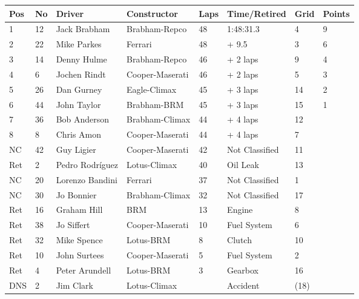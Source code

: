 \documentclass{article}
\begin{document}
\begin{tabular}{llllllll}
\toprule
Pos & No & Driver & Constructor & Laps & Time/Retired & Grid & Points \\
\midrule
1 & 12 & Jack Brabham & Brabham-Repco & 48 & 1:48:31.3 & 4 & 9 \\
2 & 22 & Mike Parkes & Ferrari & 48 & + 9.5 & 3 & 6 \\
3 & 14 & Denny Hulme & Brabham-Repco & 46 & + 2 laps & 9 & 4 \\
4 & 6 & Jochen Rindt & Cooper-Maserati & 46 & + 2 laps & 5 & 3 \\
5 & 26 & Dan Gurney & Eagle-Climax & 45 & + 3 laps & 14 & 2 \\
6 & 44 & John Taylor & Brabham-BRM & 45 & + 3 laps & 15 & 1 \\
7 & 36 & Bob Anderson & Brabham-Climax & 44 & + 4 laps & 12 &  \\
8 & 8 & Chris Amon & Cooper-Maserati & 44 & + 4 laps & 7 &  \\
NC & 42 & Guy Ligier & Cooper-Maserati & 42 & Not Classified & 11 &  \\
Ret & 2 & Pedro Rodríguez & Lotus-Climax & 40 & Oil Leak & 13 &  \\
NC & 20 & Lorenzo Bandini & Ferrari & 37 & Not Classified & 1 &  \\
NC & 30 & Jo Bonnier & Brabham-Climax & 32 & Not Classified & 17 &  \\
Ret & 16 & Graham Hill & BRM & 13 & Engine & 8 &  \\
Ret & 38 & Jo Siffert & Cooper-Maserati & 10 & Fuel System & 6 &  \\
Ret & 32 & Mike Spence & Lotus-BRM & 8 & Clutch & 10 &  \\
Ret & 10 & John Surtees & Cooper-Maserati & 5 & Fuel System & 2 &  \\
Ret & 4 & Peter Arundell & Lotus-BRM & 3 & Gearbox & 16 &  \\
DNS & 2 & Jim Clark & Lotus-Climax &  & Accident & (18) &  \\
\bottomrule
\end{tabular}
\end{document}
